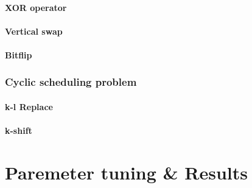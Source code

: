 \documentclass[]{article}
\begin{document}
\paragraph{XOR operator}
\paragraph{Vertical swap}
\paragraph{Bitflip}
\subsubsection{Cyclic scheduling problem}
\paragraph{k-l Replace}
\paragraph{k-shift}

\section{Paremeter tuning \& Results}



\end{document}
